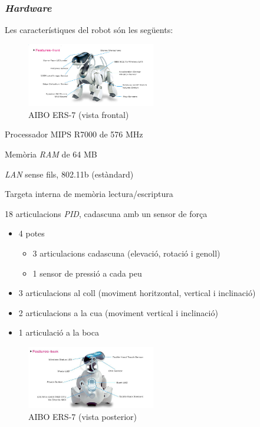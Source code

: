 \documentclass[12pt,a4paper,final,twoside]{report}
\begin{document}


\subsubsection{\textit{Hardware}}
\label{Hardware}

Les característiques del robot són les següents: \cite{Anshar2007}

\begin{itemize}
\begin{minipage}[t]{\textwidth}

\begin{figure}
                \includegraphics[width=0.5\textwidth]{Imatges/ERS-7(front).jpg}
                \caption{AIBO ERS-7 (vista frontal) \cite{Aibo_Images}}
\end{figure}
\item Processador MIPS R7000 de 576 MHz 
\item Memòria \textit{RAM} de 64 MB
\item \textit{LAN} sense fils, 802.11b (estàndard)
\item Targeta interna de memòria lectura/escriptura 
\item 18 articulacions \textit{PID}, cadascuna amb un sensor de força
\begin{itemize}
\item 4 potes
\begin{itemize}
\item 3 articulacions cadascuna (elevació, rotació i genoll)
\item 1 sensor de pressió a cada peu
\end{itemize}
\item 3 articulacions al coll (moviment horitzontal, vertical i inclinació)
\item 2 articulacions a la cua (moviment vertical i inclinació)
\item 1 articulació a la boca
\end{itemize}
\end{minipage}

\begin{minipage}[t]{\textwidth}
\begin{figure}
                \includegraphics[width=0.5\textwidth]{Imatges/ERS-7(back).jpg}
                \caption{AIBO ERS-7 (vista posterior) \cite{Aibo_Images}}
\end{figure}


\end{minipage}
\end{itemize}
\end{document}
